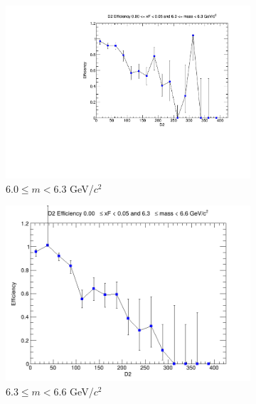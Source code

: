 \begin{figure}[p]
\begin{subfigure}[b]{0.32\textwidth}
        \includegraphics[width=\textwidth]{./kTrackerEfficiencyPlots/D2_Efficiency_xF0_mass6.pdf}
        \caption{$6.0 \leq m < 6.3$ GeV/$c^2$}
        \label{fig:xF0_mass6}
    \end{subfigure}
    \hfill
    \begin{subfigure}[b]{0.32\textwidth}
        \centering
        \includegraphics[width=\textwidth]{./kTrackerEfficiencyPlots/D2_Efficiency_xF0_mass7.png}
        \caption{$6.3 \leq m < 6.6$ GeV/$c^2$}
        \label{fig:xF0_mass7}
    \end{subfigure}
    \hfill
    \begin{subfigure}[b]{0.32\textwidth}
        \centering

\end{subfigure}
\end{figure}
